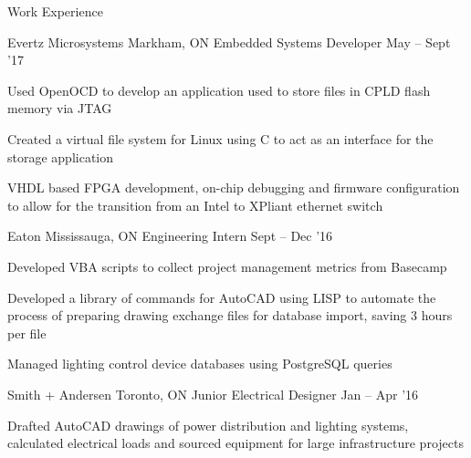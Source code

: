 \documentclass{resume} %
\begin{document}
	\begin{rSection}{Work Experience}
		\begin{rSubsection}{Evertz Microsystems}
			{Markham, ON}
			{Embedded Systems Developer}
			{May -- Sept '17}
			
			\item Used OpenOCD to develop an application used to store files in CPLD flash memory via JTAG
		 	\item Created a virtual file system for Linux using C to act as an interface for the storage application
			\item VHDL based FPGA development, on-chip debugging and firmware configuration to allow for the transition from an Intel to XPliant ethernet switch
		\end{rSubsection}
		
		\begin{rSubsection}{Eaton}
			{Mississauga, ON}
			{Engineering Intern}
			{Sept -- Dec '16}
			
			\item Developed VBA scripts to collect project management metrics from Basecamp
			\item Developed a library of commands for AutoCAD using LISP to automate the process of preparing drawing exchange files for database import, saving 3 hours per file
			\item Managed lighting control device databases using PostgreSQL queries
		\end{rSubsection}
		
		\begin{rSubsection}{Smith + Andersen}
			{Toronto, ON}
			{Junior Electrical Designer}
			{Jan -- Apr '16}

			\item Drafted AutoCAD drawings of power distribution and lighting systems, calculated electrical loads and sourced equipment for large infrastructure projects 
		\end{rSubsection}
	\end{rSection}
\end{document}
